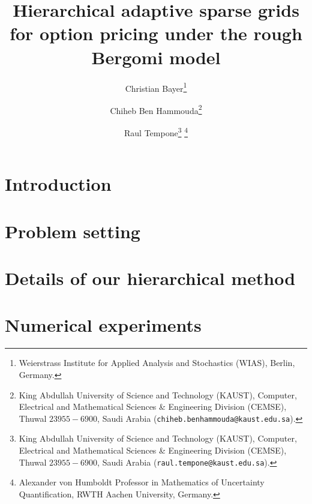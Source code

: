 \documentclass[11pt]{article}
\title{Hierarchical adaptive sparse  grids for option pricing under the rough Bergomi model}
\author{Christian Bayer\thanks{
 Weierstrass Institute for Applied Analysis and Stochastics (WIAS),
 Berlin, Germany.}
        \and Chiheb Ben Hammouda\thanks{King Abdullah University of Science and Technology (KAUST), Computer, Electrical and Mathematical Sciences \& Engineering Division (CEMSE), Thuwal $23955-6900$, Saudi Arabia ({\tt chiheb.benhammouda@kaust.edu.sa}).} 
\and  Raul Tempone\thanks{King Abdullah University of Science and Technology (KAUST), Computer, Electrical and Mathematical Sciences \& Engineering Division (CEMSE), Thuwal $23955-6900$, Saudi Arabia ({\tt raul.tempone@kaust.edu.sa}).} \thanks{Alexander von Humboldt Professor in Mathematics of Uncertainty Quantification, RWTH Aachen University, Germany.}}
\begin{document}
\maketitle

\begin{abstract}
	  
\end{abstract}






\thispagestyle{plain}

\setcounter{tocdepth}{1}


 \section{Introduction}




 \section{Problem setting}\label{sec:Problem setting}




\section{Details of our hierarchical method}\label{sec:Details our approach and error bounds}





%
%


%

  \section{Numerical experiments}\label{sec:Numerical tests}

\end{document}
